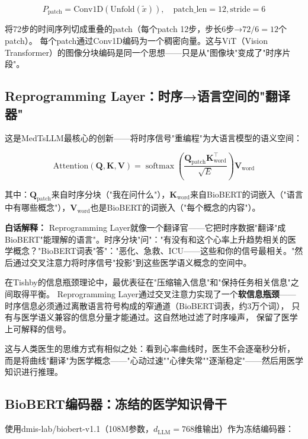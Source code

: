 \documentclass[11pt,a4paper]{ctexart}
\DeclareMathOperator{\softmax}{softmax}
\begin{document}
$$P_{\text{patch}} = \text{Conv1D}(\text{Unfold}(\tilde{x})), \quad \text{patch\_len}=12, \text{stride}=6$$

将72步的时间序列切成重叠的patch（每个patch 12步，步长6步→$72/6=12$个patch）。
每个patch通过Conv1D编码为一个稠密向量。这与ViT（Vision Transformer）的图像分块编码是同一个思想——只是从"图像块"变成了"时序片段"。

\subsection{Reprogramming Layer：时序→语言空间的"翻译器"}

这是MedTsLLM最核心的创新——将时序信号"重编程"为大语言模型的语义空间：

\begin{equation}
\text{Attention}(\mathbf{Q}, \mathbf{K}, \mathbf{V}) = \softmax\left(\frac{\mathbf{Q}_{\text{patch}}\mathbf{K}_{\text{word}}^\top}{\sqrt{E}}\right) \mathbf{V}_{\text{word}}
\end{equation}

其中：$\mathbf{Q}_{\text{patch}}$来自时序分块（"我在问什么"），$\mathbf{K}_{\text{word}}$来自BioBERT的词嵌入（"语言中有哪些概念"），$\mathbf{V}_{\text{word}}$也是BioBERT的词嵌入（"每个概念的内容"）。

\textbf{白话解释：} Reprogramming Layer就像一个翻译官——它把时序数据"翻译"成BioBERT"能理解的语言"。时序分块"问"："有没有和这个心率上升趋势相关的医学概念？"BioBERT词表"答"："恶化、急救、ICU——这些和你的信号最相关。"然后通过交叉注意力将时序信号"投影"到这些医学语义概念的空间中。

\begin{deepbox}
在Tishby的信息瓶颈理论中，最优表征在"压缩输入信息"和"保持任务相关信息"之间取得平衡。
Reprogramming Layer通过交叉注意力实现了一个\textbf{软信息瓶颈}——
时序信息必须通过离散语言符号构成的窄通道（BioBERT词表，约3万个词），
只有与医学语义兼容的信息分量才能通过。这自然地过滤了时序噪声，
保留了医学上可解释的信号。

这与人类医生的思维方式有相似之处：看到心率曲线时，医生不会逐毫秒分析，
而是将曲线"翻译"为医学概念——"心动过速""心律失常""逐渐稳定"——然后用医学知识进行推理。
\end{deepbox}

\subsection{BioBERT编码器：冻结的医学知识骨干}

使用dmis-lab/biobert-v1.1（108M参数，$d_{\text{LLM}}=768$维输出）作为冻结编码器：
\end{document}

